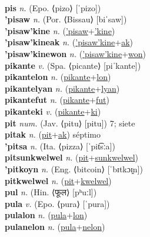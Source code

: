  \label{picin} \\
\textbf{pis} \textit{n.} (Epo. ⟨pizo⟩ [ˈpizo])
 \label{pis} \\
\textbf{'pisaw} \textit{n.} (Por. ⟨Bissau⟩ [biˈsaw])
 \label{'pisaw} \\
\textbf{'pisaw'kine} \textit{n.} (\hyperref['pisaw]{'pisaw}+\hyperref['kine]{'kine})
 \label{'pisaw'kine} \\
\textbf{'pisaw'kineak} \textit{n.} (\hyperref['pisaw'kine]{'pisaw'kine}+\hyperref[ak]{ak})
 \label{'pisaw'kineak} \\
\textbf{'pisaw'kinewon} \textit{n.} (\hyperref['pisaw'kine]{'pisaw'kine}+\hyperref[won]{won})
 \label{'pisaw'kinewon} \\
\textbf{pikante} \textit{v.} (Spa. ⟨picante⟩ [piˈkante])
 \label{pikante} \\
\textbf{pikantelon} \textit{n.} (\hyperref[pikante]{pikante}+\hyperref[lon]{lon})
 \label{pikantelon} \\
\textbf{pikantelyan} \textit{n.} (\hyperref[pikante]{pikante}+\hyperref[lyan]{lyan})
 \label{pikantelyan} \\
\textbf{pikantefut} \textit{n.} (\hyperref[pikante]{pikante}+\hyperref[fut]{fut})
 \label{pikantefut} \\
\textbf{pikanteki} \textit{v.} (\hyperref[pikante]{pikante}+\hyperref[ki]{ki})
 \label{pikanteki} \\
\textbf{pit} \textit{num.} (Jav. ⟨pitu⟩ [pitu])
7; siete \label{pit} \\
\textbf{pitak} \textit{n.} (\hyperref[pit]{pit}+\hyperref[ak]{ak})
séptimo \label{pitak} \\
\textbf{'pitsa} \textit{n.} (Ita. ⟨pizza⟩ [ˈpit͡sːa])
 \label{'pitsa} \\
\textbf{pitsunkwelwel} \textit{n.} (\hyperref[pit]{pit}+\hyperref[sunkwelwel]{sunkwelwel})
 \label{pitsunkwelwel} \\
\textbf{'pitkoyn} \textit{n.} (Eng. ⟨bitcoin⟩ [ˈbɪtkɔɪ̯n])
 \label{'pitkoyn} \\
\textbf{pitkwelwel} \textit{n.} (\hyperref[pit]{pit}+\hyperref[kwelwel]{kwelwel})
 \label{pitkwelwel} \\
\textbf{pul} \textit{n.} (Hin. ⟨फूल⟩ [pʰuːl])
 \label{pul} \\
\textbf{pula} \textit{v.} (Epo. ⟨pura⟩ [ˈpura])
 \label{pula} \\
\textbf{pulalon} \textit{n.} (\hyperref[pula]{pula}+\hyperref[lon]{lon})
 \label{pulalon} \\
\textbf{pulanelon} \textit{n.} (\hyperref[pula]{pula}+\hyperref[nelon]{nelon})
